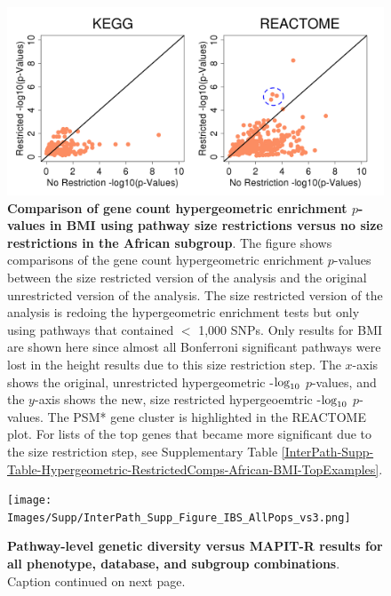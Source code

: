 \documentclass[12pt,a4paper]{article}
\def\log{{\rm log}}
\begin{document}
\begin{figure}[htbp]
\centering
\includegraphics[scale=.45]{Images/Supp/InterPath_Supp_Figure_Hypergeometric_RestrictedComps_African_BMI_vs2.png}
\caption[TBD]{\textbf{Comparison of gene count hypergeometric enrichment $p$-values in BMI using pathway size restrictions versus no size restrictions in the African subgroup}. The figure shows comparisons of the gene count hypergeometric enrichment $p$-values between the size restricted version of the analysis and the original unrestricted version of the analysis. The size restricted version of the analysis is redoing the hypergeometric enrichment tests but only using pathways that contained $<$ 1,000 SNPs. Only results for BMI are shown here since almost all Bonferroni significant pathways were lost in the height results due to this size restriction step. The $x$-axis shows the original, unrestricted hypergeometric -$\log_{10}$ $p$-values, and the $y$-axis shows the new, size restricted hypergeoemtric -$\log_{10}$ $p$-values. The PSM* gene cluster is highlighted in the REACTOME plot. For lists of the top genes that became more significant due to the size restriction step, see Supplementary Table \ref{InterPath-Supp-Table-Hypergeometric-RestrictedComps-African-BMI-TopExamples}.}
\label{InterPath-Supp-Figure-Hypergeometric-RestrictedComps-African-BMI}
\end{figure}
\clearpage

\setlength{\footskip}{3cm}
\begin{figure}[htbp]
\centering
\vspace*{-2cm}
\texttt{[image: Images/Supp/InterPath\_Supp\_Figure\_IBS\_AllPops\_vs3.png]}
\caption[TBD]{\textbf{Pathway-level genetic diversity versus MAPIT-R results for all phenotype, database, and subgroup combinations}. Caption continued on next page.}
\label{InterPath-Supp-Figure-IBS-AllPops}
\end{figure}
\clearpage
\setlength{\footskip}{1cm}
\addtocounter{figure}{-1}
\end{document}
